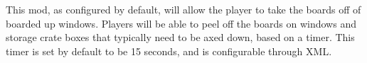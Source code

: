 This mod, as configured by default, will allow the player to take the boards off of boarded up windows. Players will be able to peel off the boards on windows and storage crate boxes that typically need to be axed down, based on a timer. This timer is set by default to be 15 seconds, and is configurable through X\+ML. 